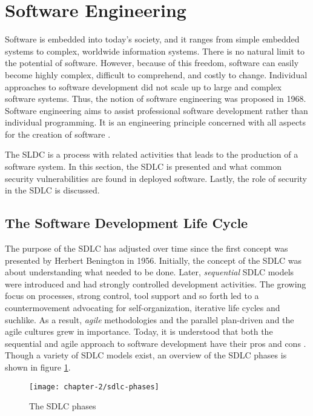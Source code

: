 \section{Software Engineering}
Software is embedded into today's society, and it ranges from simple embedded systems to complex, worldwide information systems. There is no natural limit to the potential of software. However, because of this freedom, software can easily become highly complex, difficult to comprehend, and costly to change. Individual approaches to software development did not scale up to large and complex software systems. Thus, the notion of software engineering was proposed in 1968. Software engineering aims to assist professional software development rather than individual programming. It is an engineering principle concerned with all aspects for the creation of software \cite{book:se_sommervile_2021}.

The SLDC is a process with related activities that leads to the production of a software system. In this section, the SDLC is presented and what common security vulnerabilities are found in deployed software. Lastly, the role of security in the SDLC is discussed. 

\subsection{The Software Development Life Cycle}
The purpose of the SDLC has adjusted over time since the first concept was presented by Herbert Benington in 1956. Initially, the concept of the SDLC was about understanding what needed to be done. Later, \textit{sequential} SDLC models were introduced and had strongly controlled development activities. The growing focus on processes, strong control, tool support and so forth led to a countermovement advocating for self-organization, iterative life cycles and suchlike. As a result, \textit{agile} methodologies and the parallel plan-driven and the agile cultures grew in importance. Today, it is understood that both the sequential and agile approach to software development have their pros and cons \cite{Kneuper_2017}. Though a variety of SDLC models exist, an overview of the SDLC phases is shown in figure \ref{fig:sdlc-phaces}.

\begin{figure}[!h]
    \centering
    \caption{The SDLC phases}
    \label{fig:sdlc-phaces}
    \texttt{[image: chapter-2/sdlc-phases]}
\end{figure}

